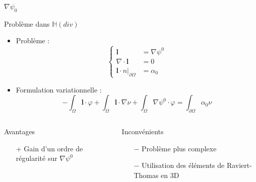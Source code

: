 \documentclass{beamer}
\newcommand{\HH}{{\mathbb{H}}}
\newcommand{\grad}{{\nabla}}
\newcommand{\diverg}{{\nabla\cdot}}
\newcommand{\restr}{{\big\rvert_{\partial\Omega}}}
\begin{document}
\begin{frame}{$\grad\psi_0$}
\begin{block}{Problème dans $\HH(div)$}
\begin{itemize}
\item Problème :
\[\left\{
\begin{aligned}
\mathbf{l} &= \grad \psi^0\\
\diverg\mathbf{l} &= 0\\
\mathbf{l}\cdot n\restr &= \alpha_0
\end{aligned}
\right.\]
\item Formulation variationnelle :
\[
-\int_\Omega \mathbf{l}\cdot\varphi + \int_\Omega \mathbf{l}\cdot\grad\nu + \int_\Omega \grad\psi^0\cdot\varphi  = \int_{\partial\Omega} \alpha_0\nu
\]
\end{itemize}
\end{block}
\begin{columns}[t]
\begin{column}{5cm}
\begin{exampleblock}{Avantages}
\begin{itemize}
\item[+] Gain d'un ordre de régularité sur $\grad\psi^0$
\end{itemize}
\end{exampleblock}
\end{column}
\begin{column}{5cm}
\begin{alertblock}{Inconvénients}
\begin{itemize}
\item[$-$] Problème plus complexe
\item[$-$] Utilisation des éléments de Raviert-Thomas en 3D
\end{itemize}
\end{alertblock}
\end{column}
\end{columns}
\end{frame}
\end{document}
